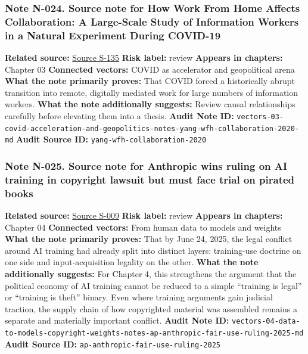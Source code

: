 \documentclass[
  american,
  11pt,
  letterpaper,
]{article}
\begin{document}
\subsubsection{Note N-024. Source note for How Work From Home Affects
Collaboration: A Large-Scale Study of Information Workers in a Natural
Experiment During
COVID-19}\label{note-n-024-vectors-03-covid-acceleration-and-geopolitics-notes-yang-wfh-collaboration-2020-md}

\textbf{Related source:}
\hyperref[source-s-135-how-work-from-home-affects-collaboration-a-large-scale-study-of-information-workers-in-a-natural-experiment-during-covid-19]{Source
S-135} \textbf{Risk label:} review \textbf{Appears in chapters:} Chapter
03 \textbf{Connected vectors:} COVID as accelerator and geopolitical
arena \textbf{What the note primarily proves:} That COVID forced a
historically abrupt transition into remote, digitally mediated work for
large numbers of information workers. \textbf{What the note additionally
suggests:} Review causal relationships carefully before elevating them
into a thesis. \textbf{Audit Note ID:}
\texttt{vectors-03-covid-acceleration-and-geopolitics-notes-yang-wfh-collaboration-2020-md}
\textbf{Audit Source ID:} \texttt{yang-wfh-collaboration-2020}

\subsubsection{Note N-025. Source note for Anthropic wins ruling on AI
training in copyright lawsuit but must face trial on pirated
books}\label{note-n-025-vectors-04-data-to-models-copyright-weights-notes-ap-anthropic-fair-use-ruling-2025-md}

\textbf{Related source:}
\hyperref[source-s-009-anthropic-wins-ruling-on-ai-training-in-copyright-lawsuit-but-must-face-trial-on-pirated-books]{Source
S-009} \textbf{Risk label:} review \textbf{Appears in chapters:} Chapter
04 \textbf{Connected vectors:} From human data to models and weights
\textbf{What the note primarily proves:} That by June 24, 2025, the
legal conflict around AI training had already split into distinct
layers: training-use doctrine on one side and input-acquisition legality
on the other. \textbf{What the note additionally suggests:} For Chapter
4, this strengthens the argument that the political economy of AI
training cannot be reduced to a simple ``training is legal'' or
``training is theft'' binary. Even where training arguments gain
judicial traction, the supply chain of how copyrighted material was
assembled remains a separate and materially important conflict.
\textbf{Audit Note ID:}
\texttt{vectors-04-data-to-models-copyright-weights-notes-ap-anthropic-fair-use-ruling-2025-md}
\textbf{Audit Source ID:} \texttt{ap-anthropic-fair-use-ruling-2025}
\end{document}
